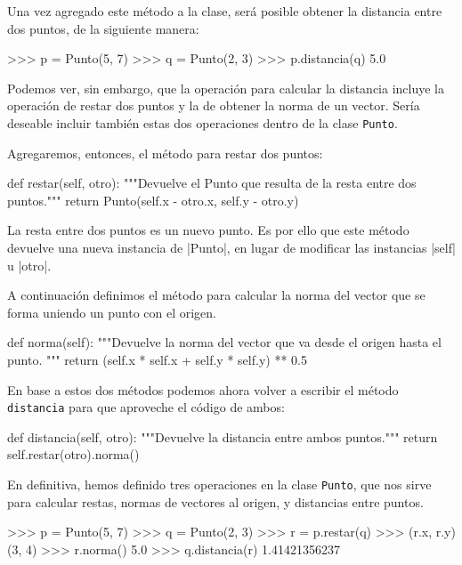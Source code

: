 Una vez agregado este método a la clase, será posible obtener la distancia
entre dos puntos, de la siguiente manera:

\begin{codigo-python-sn}
>>> p = Punto(5, 7)
>>> q = Punto(2, 3)
>>> p.distancia(q)
5.0
\end{codigo-python-sn}

Podemos ver, sin embargo, que la operación para calcular la distancia
incluye la operación de restar dos puntos y la de obtener la norma de un
vector. Sería deseable incluir también estas dos operaciones dentro de la
clase \lstinline!Punto!.

Agregaremos, entonces, el método para restar dos puntos:

\begin{codigo-python-sn}
    def restar(self, otro):
        """Devuelve el Punto que resulta de la resta
           entre dos puntos."""
        return Punto(self.x - otro.x, self.y - otro.y)
\end{codigo-python-sn}

La resta entre dos puntos es un nuevo punto.  Es por ello que este método
devuelve una nueva instancia de |Punto|, en lugar de modificar las instancias
|self| u |otro|.

A continuación definimos el método para calcular la norma del vector que
se forma uniendo un punto con el origen.

\begin{codigo-python-sn}
    def norma(self):
        """Devuelve la norma del vector que va desde el origen
           hasta el punto. """
        return (self.x * self.x + self.y * self.y) ** 0.5
\end{codigo-python-sn}

En base a estos dos métodos podemos ahora volver a escribir el método
\lstinline!distancia! para que aproveche el código de ambos:

\begin{codigo-python-sn}
    def distancia(self, otro):
        """Devuelve la distancia entre ambos puntos."""
        return self.restar(otro).norma()
\end{codigo-python-sn}

En definitiva, hemos definido tres operaciones en la clase
\lstinline!Punto!, que nos sirve para calcular restas, normas de vectores
al origen, y distancias entre puntos.

\begin{codigo-python-sn}
>>> p = Punto(5, 7)
>>> q = Punto(2, 3)
>>> r = p.restar(q)
>>> (r.x, r.y)
(3, 4)
>>> r.norma()
5.0
>>> q.distancia(r)
1.41421356237
\end{codigo-python-sn}

